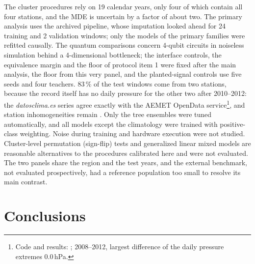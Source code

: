 \documentclass[11pt,a4paper]{article}
\begin{document}
The cluster procedures rely on 19 calendar years, only four of which contain all four stations, and the MDE is uncertain by a factor of about two. The primary analysis uses the archived pipeline, whose imputation looked ahead for 24 training and 2 validation windows; only the models of the primary families were refitted causally. The quantum comparisons concern 4-qubit circuits in noiseless simulation behind a 4-dimensional bottleneck; the interface controls, the equivalence margin and the floor of protocol item 1 were fixed after the main analysis, the floor from this very panel, and the planted-signal controls use five seeds and four teachers. 83\,\% of the test windows come from two stations, because the record itself has no daily pressure for the other two after 2010--2012: the \textit{datosclima.es} series agree exactly with the AEMET OpenData service\footnote{Code and results: ; 2008--2012, largest difference of the daily pressure extremes 0.0\,hPa.}, and station inhomogeneities remain \citep{alexandersson1986,peterson1998}. Only the tree ensembles were tuned automatically, and all models except the climatology were trained with positive-class weighting. Noise during training \citep{wang2021noise} and hardware execution were not studied. Cluster-level permutation (sign-flip) tests and generalized linear mixed models are reasonable alternatives to the procedures calibrated here and were not evaluated. The two panels share the region and the test years, and the external benchmark, not evaluated prospectively, had a reference population too small to resolve its main contrast.

\FloatBarrier
\section{Conclusions}
\end{document}
